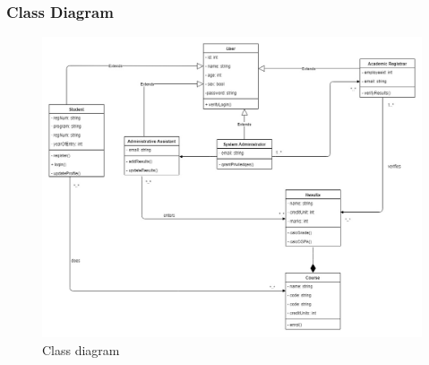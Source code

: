 \subsubsection{Class Diagram}
\begin{figure}[H]
\includegraphics[scale=0.4]{images/class.jpg}
\caption{Class diagram}
\end{figure}

